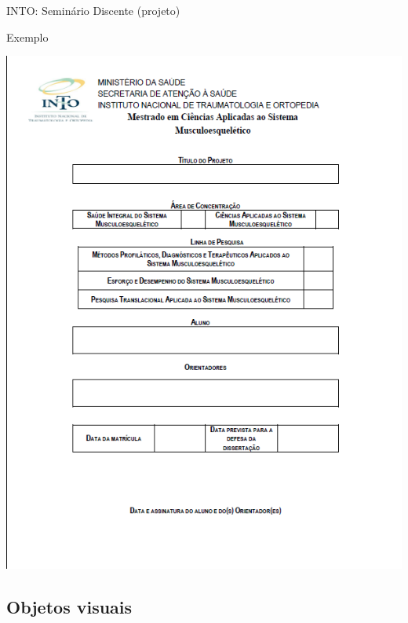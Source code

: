 \documentclass{beamer}
\begin{document}
\begin{frame}{INTO: Seminário Discente (projeto)}
  \begin{exampleblock}{Exemplo}
    \begin{center}
      \includegraphics[height=\textheight]{EstruturaII/projeto}
    \end{center}
  \end{exampleblock}
\end{frame}

\subsection{Objetos visuais}
\end{document}
